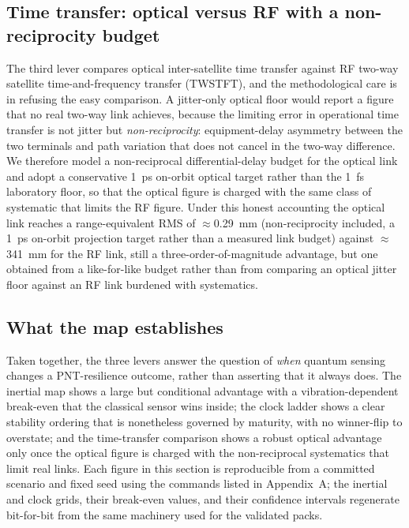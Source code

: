 \subsection{Time transfer: optical versus RF with a non-reciprocity budget}

The third lever compares optical inter-satellite time transfer against RF two-way
satellite time-and-frequency transfer (TWSTFT), and the methodological care is in
refusing the easy comparison. A jitter-only optical floor would report a figure that
no real two-way link achieves, because the limiting error in operational time
transfer is not jitter but \emph{non-reciprocity}: equipment-delay asymmetry between
the two terminals and path variation that does not cancel in the two-way difference.
We therefore model a non-reciprocal differential-delay budget for the optical link
\citep{giorgetta2013,deschenes2016} and adopt a conservative \SI{1}{\pico\second}
on-orbit optical target rather than the \SI{1}{\femto\second} laboratory floor, so
that the optical figure is charged with the same class of systematic that limits the
RF figure. Under this honest accounting the optical link reaches a range-equivalent
RMS of $\approx$\SI{0.29}{\milli\metre} (non-reciprocity included, a
\SI{1}{\pico\second} on-orbit projection target rather than a measured link budget)
against $\approx$\SI{341}{\milli\metre} for the RF link, still a
three-order-of-magnitude advantage, but one obtained from a like-for-like budget
rather than from comparing an optical jitter floor against an RF link burdened with
systematics.

\subsection{What the map establishes}

Taken together, the three levers answer the question of \emph{when} quantum sensing
changes a PNT-resilience outcome, rather than asserting that it always does. The
inertial map shows a large but conditional advantage with a vibration-dependent
break-even that the classical sensor wins inside; the clock ladder shows a clear
stability ordering that is nonetheless governed by maturity, with no winner-flip to
overstate; and the time-transfer comparison shows a robust optical advantage only
once the optical figure is charged with the non-reciprocal systematics that limit
real links. Each figure in this section is reproducible from a committed scenario and
fixed seed using the commands listed in Appendix~A; the inertial and clock grids,
their break-even values, and their confidence intervals regenerate bit-for-bit from
the same machinery used for the validated packs.
